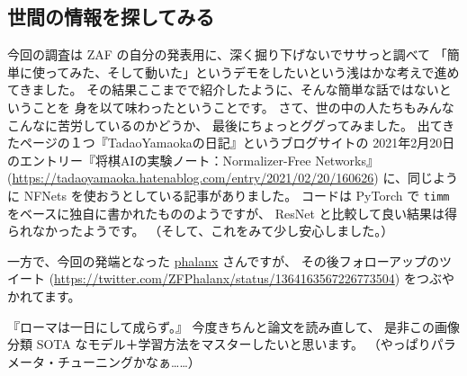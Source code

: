 \documentclass[dvipdfmx,autodetect-engine,10pt,b5paper,papersize,openany,dvipsnames]{jsbook}
\begin{document}
\begin{multicols}{2}
\section{世間の情報を探してみる}
今回の調査は ZAF の自分の発表用に、深く掘り下げないでササっと調べて
「簡単に使ってみた、そして動いた」というデモをしたいという浅はかな考えで進めてきました。
その結果ここまでで紹介したように、そんな簡単な話ではないということを
身を以て味わったということです。
さて、世の中の人たちもみんなこんなに苦労しているのかどうか、
最後にちょっとググってみました。
出てきたページの１つ『TadaoYamaokaの日記』というブログサイトの
2021年2月20日のエントリー『将棋AIの実験ノート：Normalizer-Free Networks』
(\url{https://tadaoyamaoka.hatenablog.com/entry/2021/02/20/160626})
に、同じように NFNets を使おうとしている記事がありました。
コードは PyTorch で \texttt{timm} をベースに独自に書かれたもののようですが、
ResNet と比較して良い結果は得られなかったようです。
（そして、これをみて少し安心しました。）

一方で、今回の発端となった
\href{https://twitter.com/ZFPhalanx}{phalanx} さんですが、
その後フォローアップのツイート
(\url{https://twitter.com/ZFPhalanx/status/1364163567226773504})
をつぶやかれてます。

『ローマは一日にして成らず。』
今度きちんと論文を読み直して、
是非この画像分類 SOTA なモデル＋学習方法をマスターしたいと思います。
（やっぱりパラメータ・チューニングかなぁ……）


\end{multicols}

\vspace{2cm}

\color{Maroon}
\begin{center}
\end{center}
\color{black}

\vspace{2cm}

\end{document}
